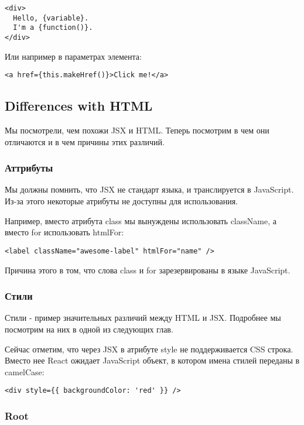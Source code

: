 \begin{lstlisting}
<div>
  Hello, {variable}.
  I'm a {function()}.
</div>	
\end{lstlisting}


Или например в параметрах элемента:

\begin{lstlisting}
<a href={this.makeHref()}>Click me!</a>
\end{lstlisting}

\subsection{Differences with HTML}

Мы посмотрели, чем похожи JSX и HTML. Теперь посмотрим в чем они отличаются и в чем причины этих различий.

\subsubsection{Аттрибуты}

Мы должны помнить, что JSX не стандарт языка, и транслируется в JavaScript. Из-за этого некоторые атрибуты не доступны для использования.

Например, вместо атрибута class мы вынуждены использовать className, а вместо for использовать htmlFor:

\begin{lstlisting}
<label className="awesome-label" htmlFor="name" />
\end{lstlisting}

Причина этого в том, что слова class и for зарезервированы в языке JavaScript.

\subsubsection{Стили}

Стили - пример значительных различий между HTML и JSX. Подробнее мы посмотрим на них в одной из следующих глав. 

Сейчас отметим, что через JSX в атрибуте style не поддерживается CSS строка. Вместо нее React ожидает JavaScript объект, в котором имена стилей переданы в camelCase:

\begin{lstlisting}
<div style={{ backgroundColor: 'red' }} />
\end{lstlisting}

\subsubsection{Root}


